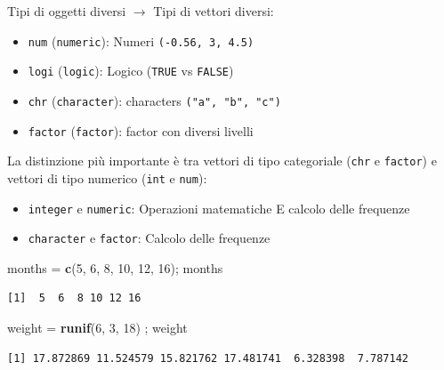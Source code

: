 \documentclass[
  a4paper,
  DIV=11,
  numbers=noendperiod]{scrreprt}
\newenvironment{Shaded}{\begin{snugshade}}{\end{snugshade}}
\newcommand{\DecValTok}[1]{\textcolor[rgb]{0.00,0.00,0.81}{#1}}
\newcommand{\FunctionTok}[1]{\textcolor[rgb]{0.13,0.29,0.53}{\textbf{#1}}}
\newcommand{\NormalTok}[1]{#1}
\newcommand{\OtherTok}[1]{\textcolor[rgb]{0.56,0.35,0.01}{#1}}
\providecommand{\tightlist}{%
  \setlength{\itemsep}{0pt}\setlength{\parskip}{0pt}}
\begin{document}
Tipi di oggetti diversi \(\rightarrow\) Tipi di vettori diversi:

\begin{itemize}
\tightlist
\item
  \texttt{num} (\texttt{numeric}): Numeri \texttt{(-0.56,\ 3,\ 4.5)}
\item
  \texttt{logi} (\texttt{logic}): Logico (\texttt{TRUE} vs
  \texttt{FALSE})
\item
  \texttt{chr} (\texttt{character}): characters
  \texttt{("a",\ "b",\ "c")}
\item
  \texttt{factor} (\texttt{factor}): factor con diversi livelli
\end{itemize}

La distinzione più importante è tra vettori di tipo categoriale
(\texttt{chr} e \texttt{factor}) e vettori di tipo numerico
(\texttt{int} e \texttt{num}):

\begin{itemize}
\tightlist
\item
  \texttt{integer} e \texttt{numeric}: Operazioni matematiche E calcolo
  delle frequenze
\item
  \texttt{character} e \texttt{factor}: Calcolo delle frequenze
\end{itemize}

\begin{Shaded}
\begin{Highlighting}[]
\NormalTok{months }\OtherTok{=} \FunctionTok{c}\NormalTok{(}\DecValTok{5}\NormalTok{, }\DecValTok{6}\NormalTok{, }\DecValTok{8}\NormalTok{, }\DecValTok{10}\NormalTok{, }\DecValTok{12}\NormalTok{, }\DecValTok{16}\NormalTok{); months}
\end{Highlighting}
\end{Shaded}

\begin{verbatim}
[1]  5  6  8 10 12 16
\end{verbatim}

\begin{Shaded}
\begin{Highlighting}[]
\NormalTok{weight }\OtherTok{=} \FunctionTok{runif}\NormalTok{(}\DecValTok{6}\NormalTok{, }\DecValTok{3}\NormalTok{, }\DecValTok{18}\NormalTok{) ; weight}
\end{Highlighting}
\end{Shaded}

\begin{verbatim}
[1] 17.872869 11.524579 15.821762 17.481741  6.328398  7.787142
\end{verbatim}
\end{document}
